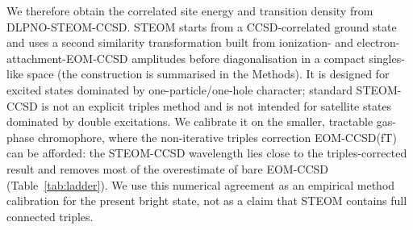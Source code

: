 \documentclass[journal=jpcbfk, manuscript=article, layout=twocolumn, doi=true]{achemso}
\begin{document}
We therefore obtain the correlated site energy and transition density from DLPNO-STEOM-CCSD. STEOM starts from a CCSD-correlated ground state and uses a second similarity transformation built from ionization- and electron-attachment-EOM-CCSD amplitudes before diagonalisation in a compact singles-like space (the construction is summarised in the Methods). It is designed for excited states dominated by one-particle/one-hole character; standard STEOM-CCSD is not an explicit triples method and is not intended for satellite states dominated by double excitations. We calibrate it on the smaller, tractable gas-phase chromophore, where the non-iterative triples correction EOM-CCSD(fT) can be afforded: the STEOM-CCSD wavelength lies close to the triples-corrected result and removes most of the overestimate of bare EOM-CCSD (Table~\ref{tab:ladder}). We use this numerical agreement as an empirical method calibration for the present bright state, not as a claim that STEOM contains full connected triples.
\end{document}
